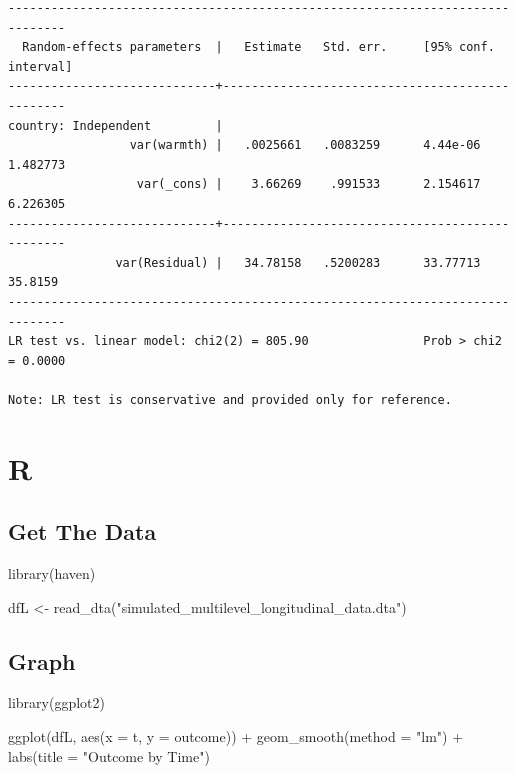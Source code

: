\documentclass[
  letterpaper,
  DIV=11,
  numbers=noendperiod]{scrreprt}
\newenvironment{Shaded}{\begin{snugshade}}{\end{snugshade}}
\newcommand{\AttributeTok}[1]{\textcolor[rgb]{0.40,0.45,0.13}{#1}}
\newcommand{\FunctionTok}[1]{\textcolor[rgb]{0.28,0.35,0.67}{#1}}
\newcommand{\NormalTok}[1]{\textcolor[rgb]{0.00,0.23,0.31}{#1}}
\newcommand{\OtherTok}[1]{\textcolor[rgb]{0.00,0.23,0.31}{#1}}
\newcommand{\SpecialCharTok}[1]{\textcolor[rgb]{0.37,0.37,0.37}{#1}}
\newcommand{\StringTok}[1]{\textcolor[rgb]{0.13,0.47,0.30}{#1}}
\begin{document}
\begin{verbatim}
------------------------------------------------------------------------------
  Random-effects parameters  |   Estimate   Std. err.     [95% conf. interval]
-----------------------------+------------------------------------------------
country: Independent         |
                 var(warmth) |   .0025661   .0083259      4.44e-06    1.482773
                  var(_cons) |    3.66269    .991533      2.154617    6.226305
-----------------------------+------------------------------------------------
               var(Residual) |   34.78158   .5200283      33.77713     35.8159
------------------------------------------------------------------------------
LR test vs. linear model: chi2(2) = 805.90                Prob > chi2 = 0.0000

Note: LR test is conservative and provided only for reference.
\end{verbatim}

\section{R}

\subsection{Get The Data}\label{get-the-data-4}

\begin{Shaded}
\begin{Highlighting}[]
\FunctionTok{library}\NormalTok{(haven)}

\NormalTok{dfL }\OtherTok{\textless{}{-}} \FunctionTok{read\_dta}\NormalTok{(}\StringTok{"simulated\_multilevel\_longitudinal\_data.dta"}\NormalTok{)}
\end{Highlighting}
\end{Shaded}

\subsection{Graph}\label{graph-4}

\begin{Shaded}
\begin{Highlighting}[]
\FunctionTok{library}\NormalTok{(ggplot2)}

\FunctionTok{ggplot}\NormalTok{(dfL,}
       \FunctionTok{aes}\NormalTok{(}\AttributeTok{x =}\NormalTok{ t,}
           \AttributeTok{y =}\NormalTok{ outcome)) }\SpecialCharTok{+} 
  \FunctionTok{geom\_smooth}\NormalTok{(}\AttributeTok{method =} \StringTok{"lm"}\NormalTok{) }\SpecialCharTok{+}
  \FunctionTok{labs}\NormalTok{(}\AttributeTok{title =} \StringTok{"Outcome by Time"}\NormalTok{)}
\end{Highlighting}
\end{Shaded}
\end{document}
